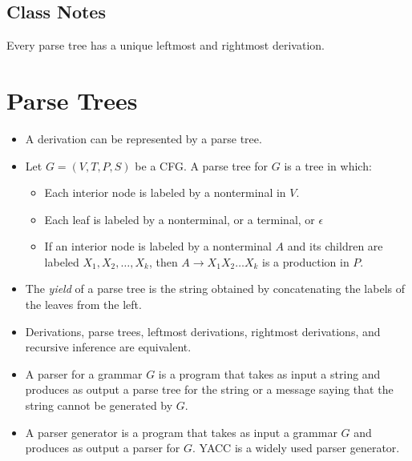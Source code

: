 \documentclass[]{article}
\begin{document}
\begin{enumerate}
  \subsection*{Class Notes}
    Every parse tree has a unique leftmost and rightmost derivation.
  
\section{Parse Trees}
  \begin{itemize}
    \item A derivation can be represented by a parse tree.
    \item Let $G = (V, T, P, S)$ be a CFG. A parse tree for $G$ is a tree in
    which:
      \begin{itemize}
        \item Each interior node is labeled by a nonterminal in $V$.
        \item Each leaf is labeled by a nonterminal, or a terminal, or
        $\epsilon$
        \item If an interior node is labeled by a nonterminal $A$ and its 
        children are labeled $X_1,X_2,\ldots,X_k$, then $A \rightarrow 
        X_1X_2\ldots{X_k}$ is a production in $P$.
      \end{itemize}
    \item The \emph{yield} of a parse tree is the string obtained by
    concatenating the labels of the leaves from the left.
    \item Derivations, parse trees, leftmost derivations, rightmost derivations,
    and recursive inference are equivalent.
    \item A parser for a grammar $G$ is a program that takes as input a string
    and produces as output a parse tree for the string or a message saying that
    the string cannot be generated by $G$.
    \item A parser generator is a program that takes as input a grammar $G$ and
    produces as output a parser for $G$. YACC is a widely used parser generator.
  \end{itemize}


\end{enumerate}
\end{document}
